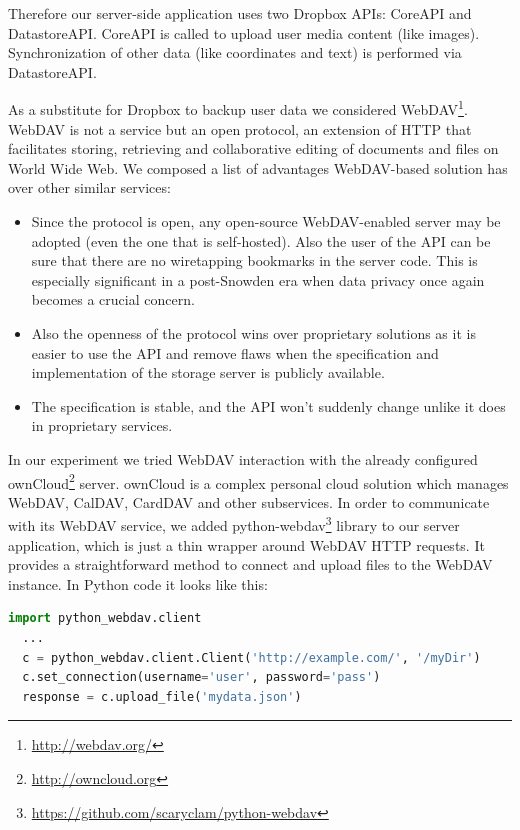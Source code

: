 \documentclass[12pt,a4paper]{article}
\begin{document}
Therefore our server-side application uses two Dropbox APIs: CoreAPI
and DatastoreAPI. CoreAPI is called to upload user media content (like
images). Synchronization of other data (like coordinates and text) is
performed via DatastoreAPI.

As a substitute for Dropbox to backup user data we considered
WebDAV\footnote{\url{http://webdav.org/}}. WebDAV is not a service but
an open protocol, an extension of HTTP that facilitates storing,
retrieving and collaborative editing of documents and files on World
Wide Web. We composed a list of advantages WebDAV-based solution has
over other similar services:

\begin{itemize}
\item Since the protocol is open, any open-source WebDAV-enabled
  server may be adopted (even the one that is self-hosted). Also the
  user of the API can be sure that there are no wiretapping bookmarks
  in the server code. This is especially significant in a post-Snowden
  era when data privacy once again becomes a crucial concern.
\item Also the openness of the protocol wins over proprietary
  solutions as it is easier to use the API and remove flaws when the
  specification and implementation of the storage server is publicly
  available.
\item The specification is stable, and the API won't suddenly change
  unlike it does in proprietary services.
\end{itemize}

In our experiment we tried WebDAV interaction with the already
configured ownCloud\footnote{\url{http://owncloud.org}} server.
ownCloud is a complex personal cloud solution which manages WebDAV,
CalDAV, CardDAV and other subservices. In order to communicate with
its WebDAV service, we added
python-webdav\footnote{\url{https://github.com/scaryclam/python-webdav}}
library to our server application, which is just a thin wrapper around
WebDAV HTTP requests. It provides a straightforward method to connect
and upload files to the WebDAV instance. In Python code it looks like
this:

\begin{lstlisting}[language=Python]
  import python_webdav.client
  ...
  c = python_webdav.client.Client('http://example.com/', '/myDir')
  c.set_connection(username='user', password='pass')
  response = c.upload_file('mydata.json')
\end{lstlisting}
\end{document}
